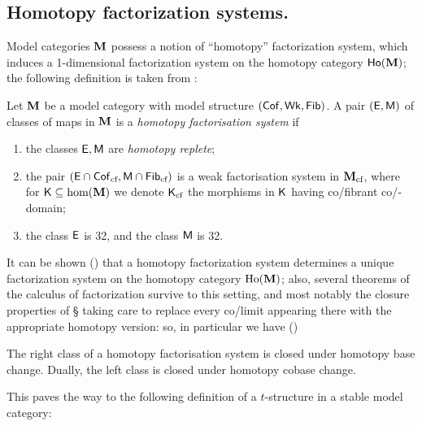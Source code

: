 \subsection{Homotopy factorization systems.}
Model categories $\mathbf{M}$ possess a notion of ``homotopy'' factorization system, which induces a 1\hyp{}dimensional factorization system on the homotopy category $\mathsf{Ho}(\mathbf{M})$; the following definition is taken from \cite[\adef \textbf{F.1.3}]{Joy}:
\begin{definition}\label{ho.fs}
Let $\mathbf{M}$ be a model category with model structure $(\mathsf{Cof},\mathsf{Wk}, \mathsf{Fib})$. A pair $(\mathsf{E},\mathsf{M})$ of classes of maps in $\mathbf{M}$ is a \emph{homotopy factorisation system} if
\begin{enumerate}[label=(\smallcap{hfs}\oldstylenums{\arabic*})]
\item the classes $\mathsf{E},\mathsf{M}$ are \emph{homotopy replete};
\item the pair $(\mathsf{E}\cap\mathsf{Cof}_\text{cf}, \mathsf{M}\cap \mathsf{Fib}_\text{cf})$ is a weak factorisation system in $\mathbf{M}_\text{cf}$, where for $\mathsf{K}\subseteq\text{hom}(\mathbf{M})$ we denote $\mathsf{K}_\text{cf}$ the morphisms in $\mathsf{K}$ having co\fshyp{}fibrant co\fshyp{}domain;
\item the class $\mathsf{E}$ is 32, and the class $\mathsf{M}$ is 32.
\end{enumerate}
\end{definition}
It can be shown (\cite[\aprop \textbf{F.2.6}]{Joy}) that a homotopy factorization system determines a unique factorization system on the homotopy category $\text{Ho}(\mathbf{M})$; also, several theorems of the calculus of factorization survive to this setting, and most notably the closure properties of \S{} taking care to replace every co\fshyp{}limit appearing there with the appropriate homotopy version: so, in particular we have (\cite[\aprop \textbf{F.4.8}]{Joy})
\begin{proposition}
The right class of a homotopy factorisation system is closed under
homotopy base change. Dually, the left class is closed under homotopy cobase
change.
\end{proposition}
This paves the way to the following definition of a $t$\hyp{}structure in a stable model category:
